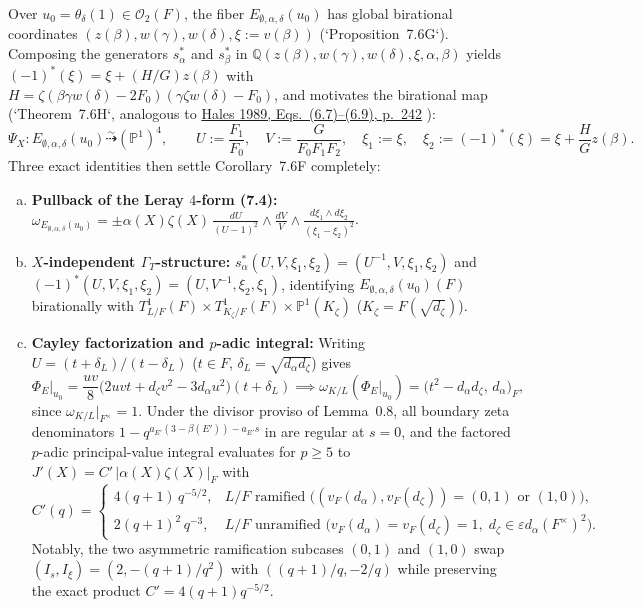 \documentclass[11pt,letterpaper]{article}
\newcommand{\ooo}{\mathcal{O}}
\begin{document}
Over $u_0=\theta_\delta(1)\in\ooo_2(F)$, the fiber $E_{\emptyset,\alpha,\delta}(u_0)$ has global birational coordinates $(z(\beta),w(\gamma),w(\delta),\xi:=v(\beta))$ (`Proposition~7.6G`). Composing the generators $s_\alpha^*$ and $s_\beta^*$ in $\mathbb{Q}(z(\beta),w(\gamma),w(\delta),\xi,\alpha,\beta)$ yields $(-1)^*(\xi)=\xi+(H/G)z(\beta)$ with $H=\zeta(\beta\gamma w(\delta)-2F_0)(\gamma\zeta w(\delta)-F_0)$, and motivates the birational map (`Theorem~7.6H`, analogous to \href{https://www.numdam.org/article/AST_1989__171-172__195_0.pdf}{Hales 1989, Eqs.~(6.7)--(6.9), p.~242} \cite{Ha89}):
\[
\Psi_X:E_{\emptyset,\alpha,\delta}(u_0)\stackrel{\sim}{\dashrightarrow}(\mathbb{P}^1)^4,\qquad
U:=\frac{F_1}{F_0},\quad V:=\frac{G}{F_0F_1F_2},\quad \xi_1:=\xi,\quad \xi_2:=(-1)^*(\xi)=\xi+\frac{H}{G}z(\beta).
\]
Three exact identities then settle Corollary~7.6F completely:
\begin{enumerate}[(a)]
\item \textbf{Pullback of the Leray $4$-form (7.4):} $\omega_{E_{\emptyset,\alpha,\delta}(u_0)}=\pm\alpha(X)\zeta(X)\,\frac{dU}{(U-1)^2}\wedge\frac{dV}{V}\wedge\frac{d\xi_1\wedge d\xi_2}{(\xi_1-\xi_2)^2}$.
\item \textbf{$X$-independent $\Gamma_T$-structure:} $s_\alpha^*(U,V,\xi_1,\xi_2)=(U^{-1},V,\xi_1,\xi_2)$ and $(-1)^*(U,V,\xi_1,\xi_2)=(U,V^{-1},\xi_2,\xi_1)$, identifying $E_{\emptyset,\alpha,\delta}(u_0)(F)$ birationally with $T^1_{L/F}(F)\times T^1_{K_\zeta/F}(F)\times\mathbb{P}^1(K_\zeta)$ ($K_\zeta=F(\sqrt{d_\zeta})$).
\item \textbf{Cayley factorization and $p$-adic integral:} Writing $U=(t+\delta_L)/(t-\delta_L)$ ($t\in F$, $\delta_L=\sqrt{d_\alpha d_\zeta}$) gives
\[
\Phi_E|_{u_0}=\frac{uv}{8}\bigl(2uvt+d_\zeta v^2-3d_\alpha u^2\bigr)(t+\delta_L)\implies
\omega_{K/L}(\Phi_E|_{u_0})=\bigl(t^2-d_\alpha d_\zeta,\,d_\alpha\bigr)_F,
\]
since $\omega_{K/L}|_{F^\times}=1$. Under the divisor proviso of Lemma~0.8, all boundary zeta denominators $1-q^{a_{E'}(3-\beta(E'))-a_{E'}s}$ in \cite{LS83} are regular at $s=0$, and the factored $p$-adic principal-value integral evaluates for $p\ge 5$ to $J'(X)=C'\,|\alpha(X)\zeta(X)|_F$ with
\[
C'(q)=\begin{cases}
4(q+1)\,q^{-5/2}, & L/F\text{ ramified }\bigl((v_F(d_\alpha),v_F(d_\zeta))=(0,1)\text{ or }(1,0)\bigr),\\[3pt]
2(q+1)^2\,q^{-3}, & L/F\text{ unramified }\bigl(v_F(d_\alpha)=v_F(d_\zeta)=1,\;d_\zeta\in\varepsilon d_\alpha(F^\times)^2\bigr).
\end{cases}
\]
Notably, the two asymmetric ramification subcases $(0,1)$ and $(1,0)$ swap $(I_s,I_\xi)=(2,-(q+1)/q^2)$ with $((q+1)/q,-2/q)$ while preserving the exact product $C'=4(q+1)q^{-5/2}$.
\end{enumerate}
\end{document}
